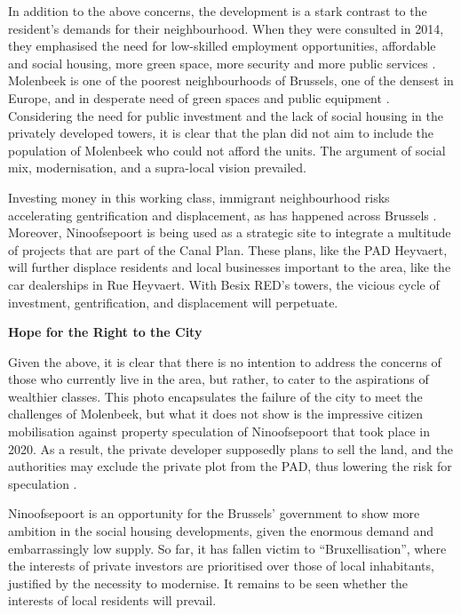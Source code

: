 \documentclass{article}[11pt]
\begin{document}
In addition to the above concerns, the development is a stark contrast to the resident's demands for their neighbourhood. When they were consulted in 2014, they emphasised the need for low-skilled employment opportunities, affordable and social housing, more green space, more security and more public services \parencite{diagnosticNinove}. 
Molenbeek is one of the poorest neighbourhoods of Brussels, one of the densest in Europe, and in desperate need of green spaces and public equipment \parencite{ieb2019ninove}. Considering the need for public investment and the lack of social housing in the privately developed towers, it is clear that the plan did not aim to include the population of Molenbeek who could not afford the units. 
The argument of social mix, modernisation, and a supra-local vision prevailed.

Investing money in this working class, immigrant neighbourhood risks accelerating gentrification and displacement, as has happened across Brussels \parencite{van2010gentrifying}.
Moreover, Ninoofsepoort is being used as a strategic site to integrate a multitude of projects that are part of the Canal Plan. These plans, like the PAD Heyvaert, will further displace residents and local businesses important to the area, like the car dealerships in Rue Heyvaert.
With Besix RED's towers, the vicious cycle of investment, gentrification, and displacement will perpetuate.


\textbf{Hope for the Right to the City}

Given the above, it is clear that there is no intention to address the concerns of those who currently live in the area, but rather, to cater to the aspirations of wealthier classes. 
This photo encapsulates the failure of the city to meet the challenges of Molenbeek, but what it does not show is the impressive citizen mobilisation against property speculation of Ninoofsepoort that took place in 2020. As a result, the private developer supposedly plans to sell the land, and the authorities may exclude the private plot from the PAD, thus lowering the risk for speculation \parencite{ieb2020ninove}.

Ninoofsepoort is an opportunity for the Brussels' government to show more ambition in the social housing developments, given the enormous demand and embarrassingly low supply. So far, it has fallen victim to ``Bruxellisation'', where the interests of private investors are prioritised over those of local inhabitants, justified by the necessity to modernise. It remains to be seen whether the interests of local residents will prevail.

\pagebreak

\printbibliography 
\end{document}
